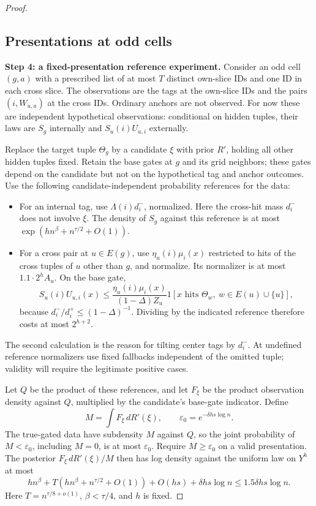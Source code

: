 \begin{proof}
\subsection{Presentations at odd cells}
\label{sec:presentations-at-odd-cells}

\noindent\textbf{Step 4: a fixed-presentation reference experiment.}\quad
Consider an odd cell \((g,a)\) with a prescribed list of at most \(T\) distinct own-slice IDs and one ID in each cross slice. The observations are the tags at the own-slice IDs and the pairs \((i,W_{u,a})\) at the cross IDs. Ordinary anchors are not observed. For now these are independent hypothetical observations: conditional on hidden tuples, their laws are \(S_g\) internally and \(S_u(i)U_{u,i}\) externally.

Replace the target tuple \(\Theta_g\) by a candidate \(\xi\) with prior \(R'\), holding all other hidden tuples fixed. Retain the base gates at \(g\) and its grid neighbors; these gates depend on the candidate but not on the hypothetical tag and anchor outcomes. Use the following candidate-independent probability references for the data:
\begin{itemize}
\item For an internal tag, use \(\Lambda(i)d_i^-\), normalized. Here the cross-hit mass \(d_i^-\) does not involve \(\xi\). The density of \(S_g\) against this reference is at most
\(\exp(hn^\beta+n^{\tau/2}+O(1))\).
\item For a cross pair at \(u\in E(g)\), use
\(\eta_u(i)\mu_i(x)\) restricted to hits of the cross tuples of \(u\) other than \(g\), and normalize. Its normalizer is at most \(1.1\cdot2^hA_u\). On the base gate,
\[
 S_u(i)U_{u,i}(x)
 \le\frac{\eta_u(i)\mu_i(x)}
           {(1-\Delta)Z_u}
     1[x\text{ hits }\Theta_w,\ w\in E(u)\cup\{u\}],
\]
because \(d_i^-/d_i^+\le(1-\Delta)^{-1}\). Dividing by the indicated reference therefore costs at most \(2^{h+2}\).
\end{itemize}
The second calculation is the reason for tilting center tags by \(d_i^-\). At undefined reference normalizers use fixed fallbacks independent of the omitted tuple; validity will require the legitimate positive cases.

Let \(Q\) be the product of these references, and let \(F_\xi\) be the product observation density against \(Q\), multiplied by the candidate's base-gate indicator. Define
\[
 M=\int F_\xi\,dR'(\xi),\qquad
 \varepsilon_0=e^{-\delta h s\log n}.
\]
The true-gated data have subdensity \(M\) against \(Q\), so the joint probability of \(M<\varepsilon_0\), including \(M=0\), is at most \(\varepsilon_0\). Require \(M\ge\varepsilon_0\) on a valid presentation. The posterior \(F_\xi\,dR'(\xi)/M\) then has log density against the uniform law on \(Y^h\) at most
\[
 hn^\beta+T(hn^\beta+n^{\tau/2}+O(1))
          +O(hs)+\delta hs\log n
 \le1.5\delta hs\log n.
\]
Here \(T=n^{\tau/8+o(1)}\), \(\beta<\tau/4\), and \(h\) is fixed.


\end{proof}
